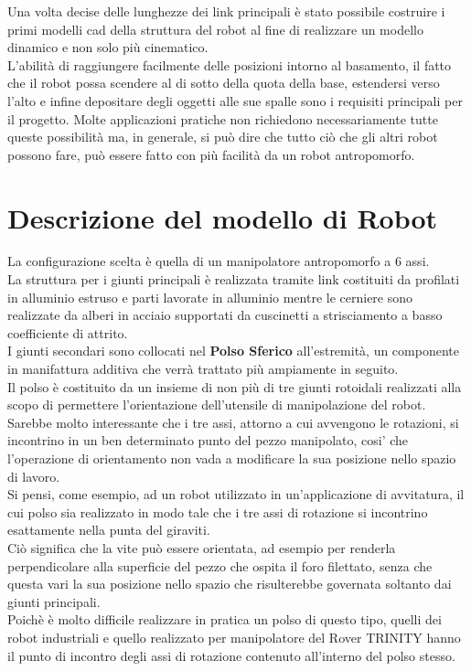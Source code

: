 \documentclass[%
corpo=11pt,
twoside,
 stile=classica,
oldstyle,
greek,%
]{toptesi}
\begin{document}
Una volta decise delle lunghezze dei link principali è stato possibile costruire i primi modelli cad della struttura del robot al fine di realizzare un modello dinamico e non solo più cinematico. \\
L'abilità di raggiungere facilmente delle posizioni intorno al basamento, il fatto che il robot possa scendere al di sotto della quota della base, estendersi verso l'alto e infine depositare degli oggetti alle sue spalle sono i requisiti principali per il progetto. 
Molte applicazioni pratiche non richiedono necessariamente tutte queste possibilità ma, in generale, si può dire che tutto ciò che gli altri robot possono fare, può essere fatto con più facilità da un robot antropomorfo.\\



\section{Descrizione del modello di Robot}
La configurazione scelta è quella di un manipolatore antropomorfo a 6 assi. \\
La struttura per i giunti principali è realizzata tramite link costituiti da profilati in alluminio estruso e parti lavorate in alluminio mentre le cerniere sono realizzate da alberi in acciaio supportati da cuscinetti a strisciamento a basso coefficiente di attrito. \\
I giunti secondari sono collocati nel \textbf{Polso Sferico} all'estremità, un componente in manifattura additiva che verrà trattato più ampiamente in seguito. \\
Il polso è costituito da un insieme di non più di tre giunti rotoidali realizzati alla scopo di permettere l'orientazione dell'utensile di manipolazione del robot. \\
Sarebbe molto interessante che i tre assi, attorno a cui avvengono le rotazioni, si incontrino in un ben determinato punto del pezzo manipolato, cosi' che l'operazione di orientamento non vada a modificare la sua posizione nello spazio di lavoro. \\
Si pensi, come esempio, ad un robot utilizzato in un'applicazione di avvitatura, il cui polso sia realizzato in modo tale che i tre assi di rotazione si incontrino esattamente nella punta del giraviti.\\
 Ciò significa che la vite può essere orientata, ad esempio per renderla perpendicolare alla superficie del pezzo che ospita il foro filettato, senza che questa vari la sua posizione nello spazio che risulterebbe governata soltanto dai giunti principali. \\
 Poichè è molto difficile realizzare in pratica un polso di questo tipo, quelli dei robot industriali e quello realizzato per manipolatore del Rover TRINITY hanno il punto di incontro degli assi di rotazione contenuto all'interno del polso stesso.
\end{document}
